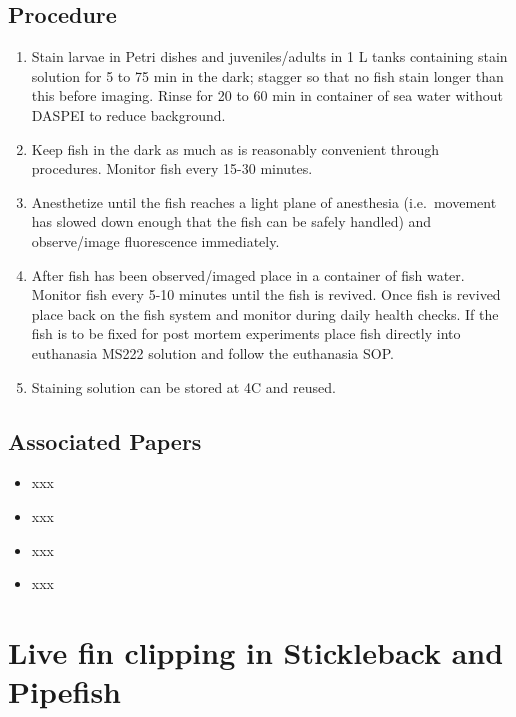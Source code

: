 \documentclass[
  letterpaper,
  DIV=11,
  numbers=noendperiod]{scrreprt}
\providecommand{\tightlist}{%
  \setlength{\itemsep}{0pt}\setlength{\parskip}{0pt}}\usepackage{longtable,booktabs,array}
\begin{document}
\hypertarget{procedure-74}{%
\section{Procedure}\label{procedure-74}}

\begin{enumerate}
\def\labelenumi{\arabic{enumi}.}
\tightlist
\item
  Stain larvae in Petri dishes and juveniles/adults in 1 L tanks
  containing stain solution for 5 to 75 min in the dark; stagger so that
  no fish stain longer than this before imaging. Rinse for 20 to 60 min
  in container of sea water without DASPEI to reduce background.
\item
  Keep fish in the dark as much as is reasonably convenient through
  procedures. Monitor fish every 15-30 minutes.
\item
  Anesthetize until the fish reaches a light plane of anesthesia
  (i.e.~movement has slowed down enough that the fish can be safely
  handled) and observe/image fluorescence immediately.
\item
  After fish has been observed/imaged place in a container of fish
  water. Monitor fish every 5-10 minutes until the fish is revived. Once
  fish is revived place back on the fish system and monitor during daily
  health checks. If the fish is to be fixed for post mortem experiments
  place fish directly into euthanasia MS222 solution and follow the
  euthanasia SOP.
\item
  Staining solution can be stored at 4C and reused.
\end{enumerate}

\hypertarget{associated-papers-51}{%
\section{Associated Papers}\label{associated-papers-51}}

\begin{itemize}
\tightlist
\item
  xxx
\item
  xxx
\item
  xxx
\item
  xxx
\end{itemize}

\hypertarget{sec-vert_exp-live_fin_clipping}{%
\chapter{Live fin clipping in Stickleback and
Pipefish}\label{sec-vert_exp-live_fin_clipping}}
\end{document}

